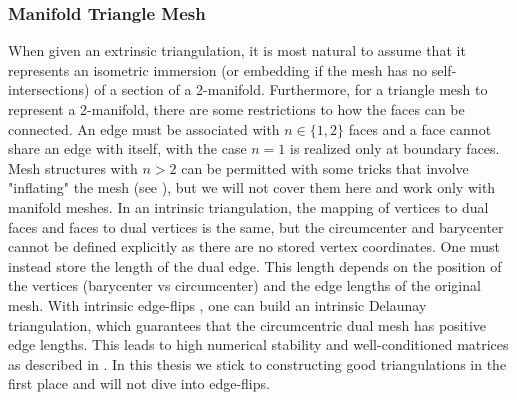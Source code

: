 \subsubsection*{Manifold Triangle Mesh}
When given an extrinsic triangulation, it is most natural to assume that it represents an isometric immersion (or embedding if the mesh has no self-intersections) of a section of a 2-manifold. Furthermore, for a triangle mesh to represent a 2-manifold, there are some restrictions to how the faces can be connected. An edge must be associated with $n \in \{1, 2\}$ faces and a face cannot share an edge with itself, with the case $n=1$ is realized only at boundary faces. Mesh structures with $n>2$ can be permitted with some tricks that involve "inflating" the mesh (see \cite{nonmanifold_laplacian}), but we will not cover them here and work only with manifold meshes. 
In an intrinsic triangulation, the mapping of vertices to dual faces and faces to dual vertices is the same, but the circumcenter and barycenter cannot be defined explicitly as there are no stored vertex coordinates. One must instead store the length of the dual edge. This length depends on the position of the vertices (barycenter vs circumcenter) and the edge lengths of the original mesh. With intrinsic edge-flips \cite{sharp2021intrinsic}, one can build an intrinsic Delaunay triangulation, which guarantees that the circumcentric dual mesh has positive edge lengths. This leads to high numerical stability and well-conditioned matrices as described in \cite{intrinsic_laplacian}. In this thesis we stick to constructing good triangulations in the first place and will not dive into edge-flips.
